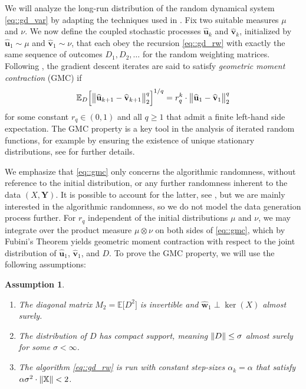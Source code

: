 \documentclass{article}
\newcommand*{\E}{\mathbb{E}} %
\newcommand*{\bbX}{\mathbb{X}}
\newcommand*{\bfY}{\mathbf{Y}}
\newcommand*{\bfu}{\mathbf{u}}
\newcommand*{\bfv}{\mathbf{v}}
\newcommand*{\bfw}{\mathbf{w}}
\DeclarePairedDelimiter{\norm}{\lVert}{\rVert}
\newcommand{\whweight}{\widehat{\bfw}}
\newcommand{\whu}{\widehat{\bfu}}
\newcommand{\whv}{\widehat{\bfv}}
\newtheorem{assumption}[lemma]{Assumption}
\begin{document}
We will analyze the long-run distribution of the random dynamical system
\eqref{eq::gd_var} by adapting the techniques used in
\cite{li_schmidt-hieber_et_al_2024}. Fix two suitable measures $\mu$ and $\nu$.
We now define the coupled stochastic processes $\whu_k$ and $\whv_k$,
initialized by $\whu_1 \sim \mu$ and $\whv_1 \sim \nu$, that each obey the
recursion \eqref{eq::gd_rw} with exactly the same sequence of outcomes $D_1,
D_2, \ldots$ for the random weighting matrices. Following
\cite{li_schmidt-hieber_et_al_2024}, the gradient descent iterates are said to
satisfy \textit{geometric moment contraction} (GMC) if \begin{align}
  \label{eq::gmc}
  \E_D\Big[\norm[\big]{\whu_{k + 1} - \whv_{k + 1}}_2^q\Big]^{1 / q} = r_q^k
  \cdot \norm[\big]{\whu_1 - \whv_1}_2^q
\end{align} for some constant $r_q \in (0, 1)$ and all $q \geq 1$ that admit a
finite left-hand side expectation. The GMC property is a key tool in the
analysis of iterated random functions, for example by ensuring the existence of
unique stationary distributions, see \cite{wu_shao_2004} for further details.

We emphasize that \eqref{eq::gmc} only concerns the algorithmic randomness,
without reference to the initial distribution, or any further randomness
inherent to the data $(X, \bfY)$. It is possible to account for the latter, see
\cite{li_schmidt-hieber_et_al_2024}, but we are mainly interested in the
algorithmic randomness, so we do not model the data generation process further.
For $r_q$ independent of the initial distributions $\mu$ and $\nu$, we may
integrate over the product measure $\mu \otimes \nu$ on both sides of
\eqref{eq::gmc}, which by Fubini's Theorem yields geometric moment contraction
with respect to the joint distribution of $\whu_1$, $\whv_1$, and $D$. To prove
the GMC property, we will use the following assumptions:

\begin{assumption}
  \label{ass::gmc}
  \begin{enumerate}
    \item The diagonal matrix $M_2 = \E\big[D^2\big]$ is invertible and
      $\whweight_1 \perp \ker(X)$ almost surely. \label{ass::gmc_a}
    \item The distribution of $D$ has compact support, meaning $\norm{D} \leq
      \sigma$ almost surely for some $\sigma < \infty$. \label{ass::gmc_b}
    \item The algorithm \eqref{eq::gd_rw} is run with constant step-sizes
      $\alpha_k = \alpha$ that satisfy $\alpha \sigma^2 \cdot \norm{\bbX} < 2$.
      \label{ass::gmc_c}
  \end{enumerate}
\end{assumption}
\end{document}
